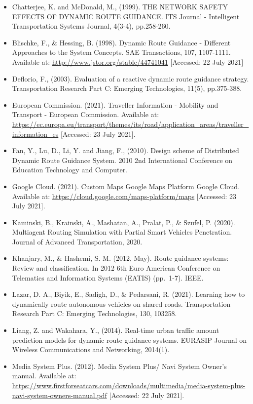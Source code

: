 \documentclass[
]{book}
\providecommand{\tightlist}{%
  \setlength{\itemsep}{0pt}\setlength{\parskip}{0pt}}
\begin{document}
\begin{itemize}
\tightlist
\item
  Chatterjee, K. and McDonald, M., (1999). THE NETWORK SAFETY EFFECTS OF DYNAMIC ROUTE GUIDANCE. ITS Journal - Intelligent Transportation Systems Journal, 4(3-4), pp.258-260.
\item
  Blischke, F., \& Hessing, B. (1998). Dynamic Route Guidance - Different Approaches to the System Concepts. SAE Transactions, 107, 1107-1111. Available at: \url{http://www.jstor.org/stable/44741041} {[}Accessed: 22 July 2021{]}
\item
  Deflorio, F., (2003). Evaluation of a reactive dynamic route guidance strategy. Transportation Research Part C: Emerging Technologies, 11(5), pp.375-388.
\item
  European Commission. (2021). Traveller Information - Mobility and Transport - European Commission. Available at: \url{https://ec.europa.eu/transport/themes/its/road/application_areas/traveller_information_es} {[}Accessed: 23 July 2021{]}.
\item
  Fan, Y., Lu, D., Li, Y. and Jiang, F., (2010). Design scheme of Distributed Dynamic Route Guidance System. 2010 2nd International Conference on Education Technology and Computer.
\item
  Google Cloud. (2021). Custom Maps \textbar{} Google Maps Platform \textbar{} Google Cloud. Available at: \url{https://cloud.google.com/maps-platform/maps} {[}Accessed: 23 July 2021{]}.
\item
  Kaminski, B., Krainski, A., Mashatan, A., Pralat, P., \& Szufel, P. (2020). Multiagent Routing Simulation with Partial Smart Vehicles Penetration. Journal of Advanced Transportation, 2020.
\item
  Khanjary, M., \& Hashemi, S. M. (2012, May). Route guidance systems: Review and classification. In 2012 6th Euro American Conference on Telematics and Information Systems (EATIS) (pp.~1-7). IEEE.
\item
  Lazar, D. A., Biyik, E., Sadigh, D., \& Pedarsani, R. (2021). Learning how to dynamically route autonomous vehicles on shared roads. Transportation Research Part C: Emerging Technologies, 130, 103258.
\item
  Liang, Z. and Wakahara, Y., (2014). Real-time urban traffic amount prediction models for dynamic route guidance systems. EURASIP Journal on Wireless Communications and Networking, 2014(1).
\item
  Media System Plus. (2012). Media System Plus/ Navi System Owner's manual. Available at: \url{https://www.firstforseatcars.com/downloads/multimedia/media-system-plus-navi-system-owners-manual.pdf} {[}Accessed: 22 July 2021{]}.

\end{itemize}
\end{document}
